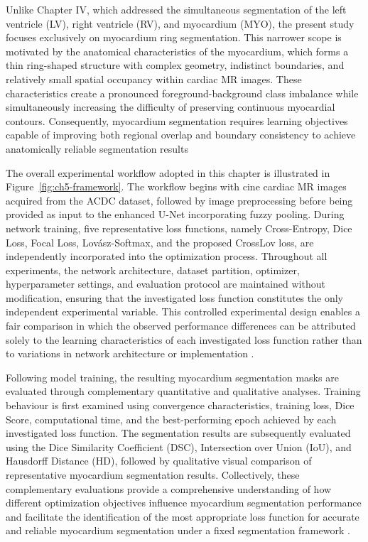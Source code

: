 Unlike Chapter IV, which addressed the simultaneous segmentation of the left ventricle (LV), right ventricle (RV), and myocardium (MYO), the present study focuses exclusively on myocardium ring segmentation. This narrower scope is motivated by the anatomical characteristics of the myocardium, which forms a thin ring-shaped structure with complex geometry, indistinct boundaries, and relatively small spatial occupancy within cardiac MR images. These characteristics create a pronounced foreground-background class imbalance while simultaneously increasing the difficulty of preserving continuous myocardial contours. Consequently, myocardium segmentation requires learning objectives capable of improving both regional overlap and boundary consistency to achieve anatomically reliable segmentation results \citep{Milletari2016,Berman2018,Karimi2019,Ma2021}

The overall experimental workflow adopted in this chapter is illustrated in Figure~\ref{fig:ch5-framework}. The workflow begins with cine cardiac MR images acquired from the ACDC dataset, followed by image preprocessing before being provided as input to the enhanced U-Net incorporating fuzzy pooling. During network training, five representative loss functions, namely Cross-Entropy, Dice Loss, Focal Loss, Lovász-Softmax, and the proposed CrossLov loss, are independently incorporated into the optimization process. Throughout all experiments, the network architecture, dataset partition, optimizer, hyperparameter settings, and evaluation protocol are maintained without modification, ensuring that the investigated loss function constitutes the only independent experimental variable. This controlled experimental design enables a fair comparison in which the observed performance differences can be attributed solely to the learning characteristics of each investigated loss function rather than to variations in network architecture or implementation \citep{Riandini2025Array}. 

Following model training, the resulting myocardium segmentation masks are evaluated through complementary quantitative and qualitative analyses. Training behaviour is first examined using convergence characteristics, training loss, Dice Score, computational time, and the best-performing epoch achieved by each investigated loss function. The segmentation results are subsequently evaluated using the Dice Similarity Coefficient (DSC), Intersection over Union (IoU), and Hausdorff Distance (HD), followed by qualitative visual comparison of representative myocardium segmentation results. Collectively, these complementary evaluations provide a comprehensive understanding of how different optimization objectives influence myocardium segmentation performance and facilitate the identification of the most appropriate loss function for accurate and reliable myocardium segmentation under a fixed segmentation framework \citep{Taha2015,Jadon2020,Ma2021,Riandini2025Array}.

